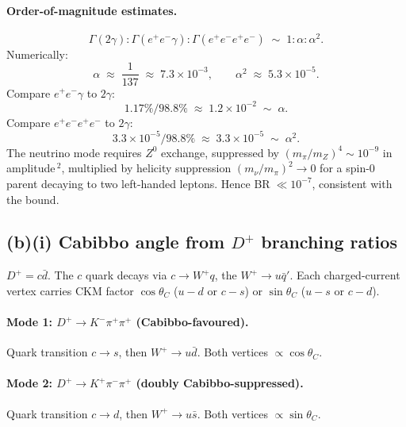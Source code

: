 \documentclass[11pt]{article}
\begin{document}
\paragraph{Order-of-magnitude estimates.}
\[
\Gamma(2\gamma):\Gamma(e^{+}e^{-}\gamma):\Gamma(e^{+}e^{-}e^{+}e^{-})\;\sim\;1:\alpha:\alpha^{2}.
\]
Numerically:
\[
\alpha\;\approx\;\frac{1}{137}\;\approx\;7.3\times 10^{-3},\qquad \alpha^{2}\;\approx\;5.3\times 10^{-5}.
\]
Compare $e^{+}e^{-}\gamma$ to $2\gamma$:
\[
1.17\%/98.8\%\;\approx\;1.2\times 10^{-2}\;\sim\;\alpha.
\]
Compare $e^{+}e^{-}e^{+}e^{-}$ to $2\gamma$:
\[
3.3\times 10^{-5}/98.8\%\;\approx\;3.3\times 10^{-5}\;\sim\;\alpha^{2}.
\]
The neutrino mode requires $Z^{0}$ exchange, suppressed by $(m_{\pi}/m_{Z})^{4}\sim 10^{-9}$ in amplitude\,$^{2}$, multiplied by helicity suppression $(m_{\nu}/m_{\pi})^{2}\to 0$ for a spin-0 parent decaying to two left-handed leptons. Hence BR$\;\ll 10^{-7}$, consistent with the bound.

\subsection*{(b)(i) Cabibbo angle from $D^{+}$ branching ratios}

$D^{+}=c\bar d$. The $c$ quark decays via $c\to W^{+}q$, the $W^{+}\to u\bar q'$. Each charged-current vertex carries CKM factor $\cos\theta_{C}$ ($u\!-\!d$ or $c\!-\!s$) or $\sin\theta_{C}$ ($u\!-\!s$ or $c\!-\!d$).

\paragraph{Mode 1: $D^{+}\to K^{-}\pi^{+}\pi^{+}$ (Cabibbo-favoured).} Quark transition $c\to s$, then $W^{+}\to u\bar d$. Both vertices $\propto\cos\theta_{C}$.
\paragraph{Mode 2: $D^{+}\to K^{+}\pi^{-}\pi^{+}$ (doubly Cabibbo-suppressed).} Quark transition $c\to d$, then $W^{+}\to u\bar s$. Both vertices $\propto\sin\theta_{C}$.
\end{document}

